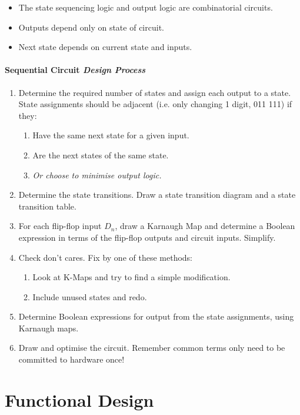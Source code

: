 \documentclass[twocolumn,english]{article}
\begin{document}
\begin{itemize}
\item The state sequencing logic and output logic are combinatorial circuits.
\item Outputs depend only on state of circuit.
\item Next state depends on current state and inputs.
\end{itemize}

\paragraph{Sequential Circuit \emph{Design Process}}
\begin{enumerate}
\item Determine the required number of states and assign each output to
a state. State assignments should be adjacent (i.e. only changing 1 digit, 011 \textrightarrow{} 111) if they:

\begin{enumerate}
\item Have the same next state for a given input.
\item Are the next states of the same state.
\item \emph{Or choose to minimise output logic.}
\end{enumerate}
\item Determine the state transitions. Draw a state transition diagram and
a state transition table.
\item For each flip-flop input $D_{n}$, draw a Karnaugh Map and determine
a Boolean expression in terms of the flip-flop outputs and circuit
inputs. Simplify.
\item Check don't cares. Fix by one of these methods:

\begin{enumerate}
\item Look at K-Maps and try to find a simple modification.
\item Include unused states and redo.
\end{enumerate}
\item Determine Boolean expressions for output from the state assignments,
using Karnaugh maps.
\item Draw and optimise the circuit. Remember common terms only need to
be committed to hardware once!
\end{enumerate}

\section{Functional Design}
\end{document}
